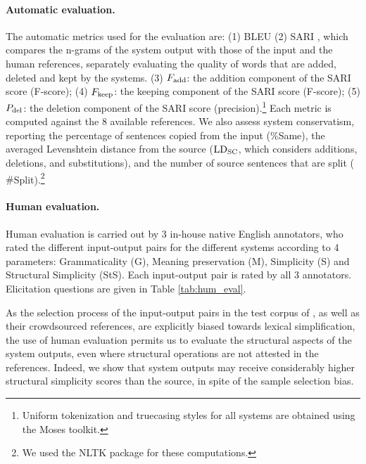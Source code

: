\documentclass[11pt,a4paper]{article}
\begin{document}
\vspace{-0.2cm}
\paragraph{Automatic evaluation.}\label{sec:automatic_evaluation}
The automatic metrics used for the evaluation are: 
(1) BLEU \citep{P02}
(2) SARI \citep[System output Against References and against the Input sentence;][]{Xu16}, which compares the n-grams of the system output with those
of the input and the human references, separately evaluating  the  quality  of  words  that  are  added, deleted and kept by the systems. 
(3) $F_{\rm add}$: the addition component of the SARI score (F-score);
(4) $F_{\rm keep}$: the keeping component of the SARI score (F-score); (5) {\bf $P_{\rm del}$}: the deletion component of the SARI score (precision).\footnote{Uniform tokenization and truecasing styles for all systems are obtained using the Moses toolkit.}
Each metric is computed against the 8 available references.
We also assess system conservatism, reporting the percentage of sentences copied from the input (\%Same), the averaged Levenshtein distance from the source (${\rm LD_{SC}}$, which considers additions, deletions, and substitutions), and the number of source sentences that are split ($\#$Split).\footnote{We used the NLTK package \citep{LB02} for these computations.}

\vspace{-0.2cm}
\paragraph{Human evaluation.} \label{sec:human_evaluation}
Human evaluation is carried out by 3 in-house native English annotators, 
who rated the different input-output pairs for the different systems according to 4 parameters: Grammaticality (G), 
Meaning preservation (M), Simplicity (S) and Structural Simplicity (StS). Each input-output pair is rated by all 3 annotators.
Elicitation questions are given in Table \ref{tab:hum_eval}.

As the selection process of the input-output pairs in the test corpus of \citet{Xu16}, as well as their crowdsourced references, are explicitly biased towards lexical simplification, the use of human evaluation permits us to evaluate the structural aspects of the system outputs, even where structural operations are not attested in the references. Indeed, we show that system outputs may receive considerably higher structural simplicity scores than the source, in spite of the sample selection bias.
\end{document}
